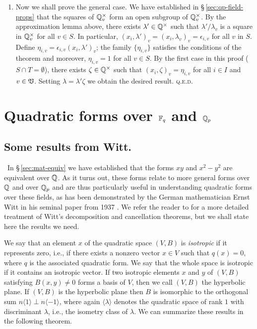 \begin{enumerate}[nosep, label=(\roman*), wide]
    \item Now we shall prove the general case. We have established in \S\,\ref{sec:qp-field-props} that the squares of \(\mathbb{Q}_v^{\times}\) form an open subgroup of \(\mathbb{Q}_v^{\times}\). By the approximation lemma above, there exists \(\lambda' \in \mathbb{Q}^{\times}\) such that \(\lambda' / \lambda_v\) is a square in \(\mathbb{Q}_v^{\times}\) for all \(v \in S\). In particular, \((x_i, \lambda')_v = (x_i, \lambda_v)_v = \epsilon_{i, v}\) for all \(v\) in \(S\). Define \(\eta_{i, v} = \epsilon_{i, v} (x_i, \lambda')_v\); the family \(\{\eta_{i, v}\}\) satisfies the conditions of the theorem and moreover, \(\eta_{i, v} = 1\) for all \(v \in S\). By the first case in this proof (\(S \cap T = \emptyset\)), there exists \(\zeta \in \mathbb{Q}^{\times}\) such that \((x_i, \zeta)_v = \eta_{i, v}\) for all \(i \in I\) and \(v \in \mathfrak{V}\). Setting \(\lambda = \lambda' \zeta\) we obtain the desired result. {\scshape q.e.d.}
\end{enumerate}

\section{Quadratic forms over \(\mathbb{F}_q\) and \(\mathbb{Q}_p\)}

\subsection{Some results from Witt.}~In \S\,\ref{sec:mat-equiv} we have established that the forms \(xy\) and \(x^2 - y^2\) are equivalent over \(\mathbb{Q}\). As it turns out, these forms relate to more general forms over \(\mathbb{Q}\) and over \(\mathbb{Q}_p\) and are thus particularly useful in understanding quadratic forms over these fields, as has been demonstrated by the German mathematician Ernst Witt in his seminal paper from 1937 \cite{witt1937theorie}. We refer the reader to \cite{lam1973quadratic} for a more detailed treatment of Witt's decomposition and cancellation theorems, but we shall state here the results we need.\label{sec:results-from-witt}

We say that an element \(x\) of the quadratic space \((V,B)\) is \emph{isotropic} if it represents zero, i.e., if there exists a nonzero vector \(x \in V\) such that \(q(x) = 0\), where \(q\) is the associated quadratic form. We say that the whole space is isotropic if it contains an isotropic vector. If two isotropic elements \(x\) and \(y\) of \((V,B)\) satisfying \(B(x,y) \neq 0\) forms a basis of \(V\), then we call \((V, B)\) the hyperbolic plane. If \((V,B)\) is the hyperbolic plane then \(B\) is isomorphic to the orthogonal sum \(n\langle 1 \rangle \perp n \langle -1 \rangle\), where again \(\langle \lambda \rangle\) denotes the quadratic space of rank \(1\) with discriminant \(\lambda\), i.e., the isometry class of \(\lambda\). We can summarize these results in the following theorem.

